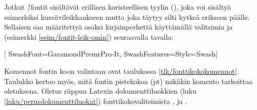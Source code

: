 Jotkut  \=/fontit sisältävät erillisen
koristeellisen tyylin (), joka voi sisältyä esimerkiksi
kursiivileikkaukseen mutta joka täytyy silti kytkeä erikseen päälle.
Sellaisen saa määritettyä osaksi kirjainperhettä käyttämällä valitsimia
 ja  (esimerkki
\ref{esim/fontit-leik-omin}) seuraavalla tavalla:

\begin{koodilohkosis}
\setmainfont{Garamond Premier Pro}[
  SwashFont={GaramondPremrPro-It},   %
  SwashFeatures={Style=Swash}]       %
\end{koodilohkosis}

\noindent
Komennot fontin koon valintaan ovat taulukossa
\ref{tlk/fonttikokokomennot}. Taulukko kertoo myös, mitä fontin
pistekokoa (pt) mikäkin komento tarkoittaa oletuksena. Oletus riippuu
Latexin dokumenttiluokkien (luku \ref{luku/perusdokumenttiluokat})
fonttikokovalitsimista \koodi{10pt}, \koodi{11pt} ja \koodi{12pt}.


%

